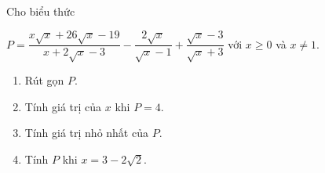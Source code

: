 	\begin{bt}%
		Cho biểu thức
		
		 $P=\dfrac{x\sqrt{x}+26\sqrt{x}-19}{x+2\sqrt{x}-3}-\dfrac{2\sqrt{x}}{\sqrt{x}-1}+\dfrac{\sqrt{x}-3}{\sqrt{x}+3}$ với $x\ge 0$ và $x\ne 1$.
		\begin{enumerate}
			\item Rút gọn $P$.
			\item Tính giá trị của $x$ khi $P=4$.
			\item Tính giá trị nhỏ nhất của $P$.
			\item Tính $P$ khi $x=3-2\sqrt{2}$.
		\end{enumerate}
\end{bt}
